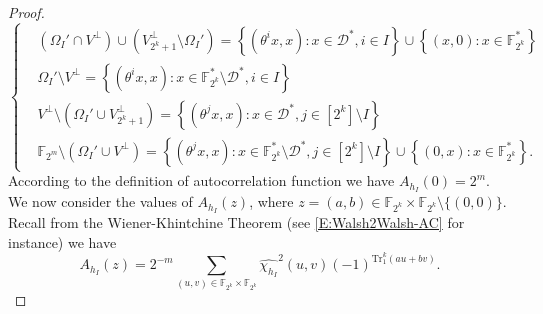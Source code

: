 \documentclass[10pt]{article}
\newcommand{\F}{\mathbb{F}}
\newcommand{\0}{\textbf{0}}
\newcommand{\1}{\textbf{1}}
\newcommand{\tr}{\mathrm{Tr}_1^k}
\begin{document}
{{\begin{proof}
\begin{equation}
\begin{cases}
    &\left( \Omega_I'\cap V^{\perp} \right)\cup \left( V_{2^k+1}^{\perp}\setminus\Omega_I' \right)= \left\{ (\theta^ix,x): x\in\mathcal{D}^*,i\in I\right\}\cup \left\{ (x,0):x\in\F_{2^k}^* \right\}\\ 
    &\Omega_I'\setminus V^{\perp} = \left\{ (\theta^ix,x):x\in\F_{2^k}^*\setminus \mathcal{D}^*, i\in I \right\} \\
    &V^{\perp}\setminus\left( \Omega_I'\cup V_{2^k+1}^{\perp} \right) =\left\{ (\theta^jx,x):x\in \mathcal{D}^*,j\in \left[ 2^k \right]\setminus I \right\}\\
    &\F_{2^m}\setminus\left( \Omega_I'\cup V^{\perp} \right) = \left\{ (\theta^jx,x):x\in\F_{2^k}^*\setminus \mathcal{D}^*,j\in \left[ 2^k \right]\setminus I \right\}\cup\left\{ (0,x):x\in\F_{2^k}^* \right\}.
\end{cases} 
\end{equation}
According to the definition of autocorrelation function we have $A_{h_I}(0)=2^m$.
We now consider the values of $A_{h_I}(z)$, where $z=(a,b) \in \F_{2^k}\times\F_{2^k}\setminus\{(0,0)\}$.
Recall from the Wiener-Khintchine Theorem (see \eqref{E:Walsh2Walsh-AC} for instance) we have
\begin{equation*}
A_{h_I}(z)=2^{-m}\sum_{(u,v)\in\F_{2^k}\times\F_{2^k}} \widehat{\chi_{h_I}}^2(u, v)(-1)^{\tr(au+bv)}.
\end{equation*}

\end{proof}}}
\end{document}
